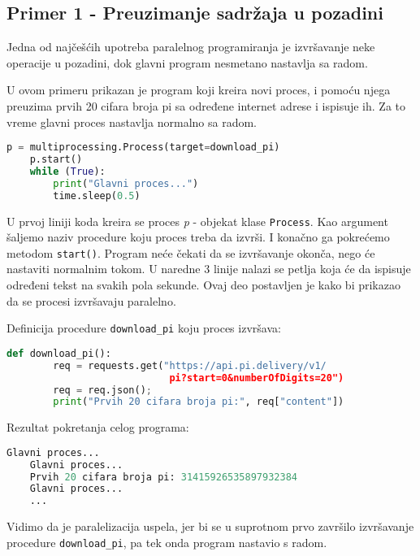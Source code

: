 \documentclass[a4paper]{article}
\begin{document}
{    \subsection{Primer 1 - Preuzimanje sadržaja u pozadini}
    Jedna od najčešćih upotreba paralelnog programiranja je izvršavanje neke operacije u pozadini, dok glavni program nesmetano nastavlja sa radom. 
    \par U ovom primeru prikazan je program koji kreira novi proces, i pomoću njega preuzima prvih 20 cifara broja pi sa određene internet adrese i ispisuje ih. Za to vreme glavni proces nastavlja normalno sa radom.
    \begin{lstlisting}[showstringspaces=false, language=Python]
    p = multiprocessing.Process(target=download_pi)
    p.start()
    while (True):
        print("Glavni proces...")
        time.sleep(0.5)
    \end{lstlisting}
    U prvoj liniji koda kreira se proces \emph{p} - objekat klase \lstinline{Process}. Kao argument šaljemo naziv procedure koju proces treba da izvrši. I konačno ga pokrećemo metodom \lstinline{start()}. Program neće čekati da se izvršavanje okonča, nego će nastaviti normalnim tokom. U naredne 3 linije nalazi se petlja koja će da ispisuje određeni tekst na svakih pola sekunde. Ovaj deo postavljen je kako bi prikazao da se procesi izvršavaju paralelno.
    \par Definicija procedure \lstinline{download_pi} koju proces izvršava:
    
    \begin{lstlisting}[showstringspaces=false, language=Python]
    def download_pi():
        req = requests.get("https://api.pi.delivery/v1/
                            pi?start=0&numberOfDigits=20")
        req = req.json();
        print("Prvih 20 cifara broja pi:", req["content"])
    \end{lstlisting}
    \par Rezultat pokretanja celog programa:
    \begin{lstlisting}[showstringspaces=false, language=Python]
    Glavni proces...
    Glavni proces...
    Prvih 20 cifara broja pi: 31415926535897932384
    Glavni proces...
    ...
    \end{lstlisting}
    Vidimo da je paralelizacija uspela, jer bi se u suprotnom prvo završilo izvršavanje procedure \lstinline{download_pi}, pa tek onda program nastavio s radom.
}
\end{document}
